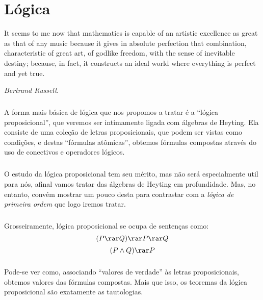 \chapter{Lógica}
    \epigraph{\justify
        It seems to me now that mathematics
        is capable of an artistic excellence
        as great as that of any music
        \elide because it gives in absolute
        perfection that combination,
        characteristic of great art, of godlike
        freedom, with the sense of inevitable
        destiny; because, in fact, it constructs
        an ideal world where everything is
        perfect and yet true.
        }{\textit{Bertrand Russell.}}
    \cls
    \paragraph{}
        A forma mais básica de lógica que nos propomos
        a tratar é a ``lógica proposicional'', que
        veremos ser intimamente ligada com álgebras de %
        Heyting. Ela consiste de uma coleção de letras
        proposicionais, que podem ser vistas como
        condições, e destas ``fórmulas atômicas'',
        obtemos fórmulas compostas através do uso de
        conectivos e operadores lógicos.
    \paragraph{}
        O estudo da lógica proposicional tem seu
        mérito, mas não será especialmente util para
        nós, afinal vamos tratar das álgebras de
        Heyting em profundidade. Mas, no entanto, %
        convém mostrar um pouco desta para contrastar
        com a {\em lógica de primeira ordem} que logo %
        iremos tratar.
    \paragraph{}
        Grosseiramente, lógica proposicional se ocupa
        de sentenças como:
        $$(P\rar Q)\rar P\rar Q$$
        $$(P\land Q)\rar P$$
    \paragraph{}
        Pode-se ver como, associando ``valores de
        verdade'' às letras proposicionais, obtemos
        valores das fórmulas compostas. Mais que isso, %
        os teoremas da lógica proposicional são
        exatamente as tautologias. %
